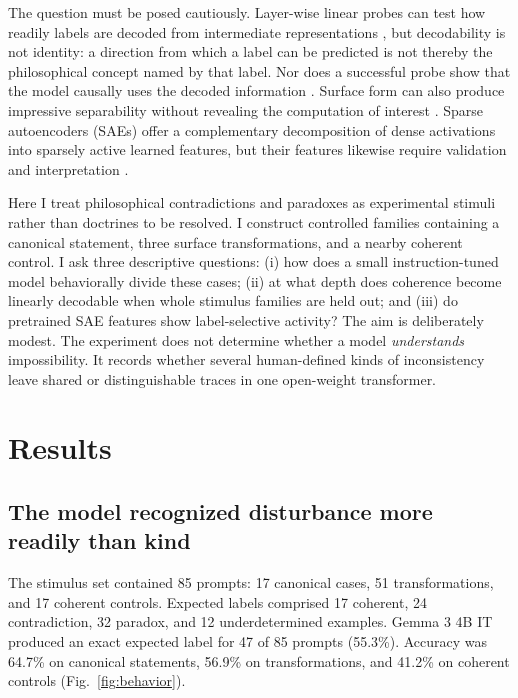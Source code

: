 \documentclass[pdflatex,sn-nature]{sn-jnl}
\begin{document}
The question must be posed cautiously. Layer-wise linear probes can test how readily labels are decoded from intermediate representations \cite{alain2016}, but decodability is not identity: a direction from which a label can be predicted is not thereby the philosophical concept named by that label. Nor does a successful probe show that the model causally uses the decoded information \cite{hewitt2019,belinkov2022}. Surface form can also produce impressive separability without revealing the computation of interest \cite{sahoo2026}. Sparse autoencoders (SAEs) offer a complementary decomposition of dense activations into sparsely active learned features, but their features likewise require validation and interpretation \cite{elhage2022,cunningham2023,lieberum2024}.

Here I treat philosophical contradictions and paradoxes as experimental stimuli rather than doctrines to be resolved. I construct controlled families containing a canonical statement, three surface transformations, and a nearby coherent control. I ask three descriptive questions: (i) how does a small instruction-tuned model behaviorally divide these cases; (ii) at what depth does coherence become linearly decodable when whole stimulus families are held out; and (iii) do pretrained SAE features show label-selective activity? The aim is deliberately modest. The experiment does not determine whether a model \emph{understands} impossibility. It records whether several human-defined kinds of inconsistency leave shared or distinguishable traces in one open-weight transformer.

\section{Results}\label{sec:results}

\subsection{The model recognized disturbance more readily than kind}

The stimulus set contained 85 prompts: 17 canonical cases, 51 transformations, and 17 coherent controls. Expected labels comprised 17 coherent, 24 contradiction, 32 paradox, and 12 underdetermined examples. Gemma 3 4B IT produced an exact expected label for 47 of 85 prompts (55.3\%). Accuracy was 64.7\% on canonical statements, 56.9\% on transformations, and 41.2\% on coherent controls (Fig.~\ref{fig:behavior}).
\end{document}
